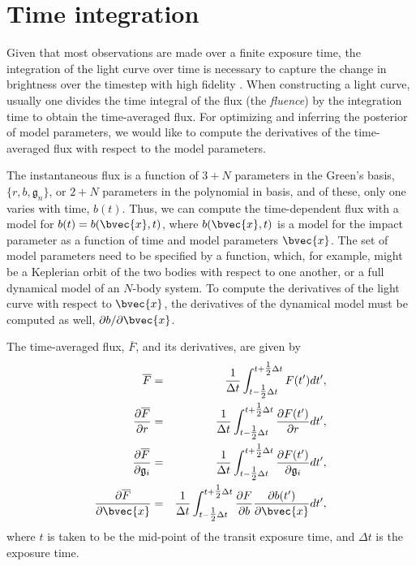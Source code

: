 \documentclass[modern,trackchanges]{aastex63}
\begin{document}
\section{Time integration} \label{sec:time}

Given that most observations are made over a finite exposure time,
the integration of the light curve over time is necessary to capture the
change in brightness over the timestep
with high fidelity \citep[e.g.,][]{Kipping2010}. When constructing
a light curve, usually one divides the time integral of the flux (the \emph{fluence})
by the integration time
to obtain the time-averaged flux. For optimizing and inferring the
posterior of model parameters, we would like to compute the derivatives
of the time-averaged flux with respect to the model parameters.

The instantaneous flux is a function of $3+N$ parameters in the Green's basis,
$\{r,b,\mathfrak{g}_n\}$, or $2+N$ parameters in the polynomial in basis, and of
these, only one varies with time, $b(t)$.  Thus, we can compute the
time-dependent flux with a model for $b(t)=b(\bvec{x},t)$, where
$b(\bvec{x},t)$ is a model for the impact parameter as a function of time
and model parameters $\bvec{x}$.  The set of model parameters need to be specified
by a function, which, for example, might be a Keplerian orbit of the two bodies
with respect to one another, or a full dynamical model of an $N$-body system.
To compute the derivatives of the light curve with respect to $\bvec{x}$, the
derivatives of the dynamical model must be computed as well, $\partial{b}/\partial{\bvec{x}}$.

The time-averaged flux, $\overline{F}$, and its derivatives, are given by
\begin{eqnarray}\label{eq:avg_flux}
\overline{F} &=& \frac{1}{\Delta t} \int_{t-\tfrac{1}{2}\Delta t}^{t+\tfrac{1}{2}\Delta t} F(t^\prime) dt^\prime,\cr
\frac{\partial \overline{F}}{\partial r} &=& \frac{1}{\Delta t} \int_{t-\tfrac{1}{2}\Delta t}^{t+\tfrac{1}{2}\Delta t} \frac{\partial F(t^\prime)}{\partial r} dt^\prime,\cr
\frac{\partial \overline{F}}{\partial \mathfrak{g}_i}&=& \frac{1}{\Delta t} \int_{t-\tfrac{1}{2}\Delta t}^{t+\tfrac{1}{2}\Delta t} \frac{\partial F(t^\prime)}{\partial \mathfrak{g}_i} dt^\prime,\cr
\frac{\partial \overline{F}}{\partial \bvec{x}} &=& \frac{1}{\Delta t}
\int_{t-\tfrac{1}{2}\Delta t}^{t+\tfrac{1}{2}\Delta t} \frac{\partial F}{\partial b}\frac{\partial b(t^\prime)}{\partial \bvec{x}} dt^\prime,
\end{eqnarray}
where $t$ is taken to be the mid-point of the transit exposure time, and
$\Delta t$ is the exposure time.
\end{document}
